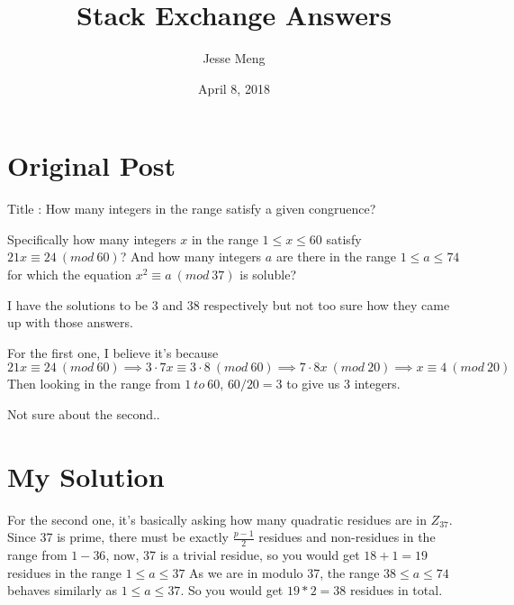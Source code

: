 \documentclass{article}
\title{Stack Exchange Answers}
\author{Jesse Meng }
\date{April 8, 2018}
\begin{document}
\maketitle

\section{Original Post}
Title : How many integers in the range satisfy a given congruence?

Specifically how many integers $x$ in the range $1 ≤ x ≤ 60$ satisfy $21x ≡ 24\ (mod\ 60)$? And how many integers $a$ are there in the range $1 ≤ a ≤ 74$ for which the equation $x^2 ≡ a\ (mod\ 37)$ is soluble?

I have the solutions to be $3$ and $38$ respectively but not too sure how they came up with those answers.

For the first one, I believe it's because $21x ≡ 24\ (mod\ 60) \implies 3\cdot7x \equiv 3\cdot8\ (mod\ 60) \implies 7\cdot8x\ (mod\ 20) \implies x \equiv 4\ (mod\ 20)$
Then looking in the range from $1\ to\ 60$, $60/20 = 3$ to give us 3 integers.

Not sure about the second..

 
\section{My Solution}
For the second one, it's basically asking how many quadratic residues are in $Z_{37}$. Since 37 is prime, there must be exactly $\frac{p-1}{2}$ residues and non-residues in the range from $1-36$, now, 37 is a trivial residue, so you would get $18+1=19$ residues in the range $1\leq a\leq37$ As we are in modulo 37, the range $38\leq a \leq74$ behaves similarly as $1\leq a\leq37$. So  you would get $19*2=38$ residues in total.
\end{document}
